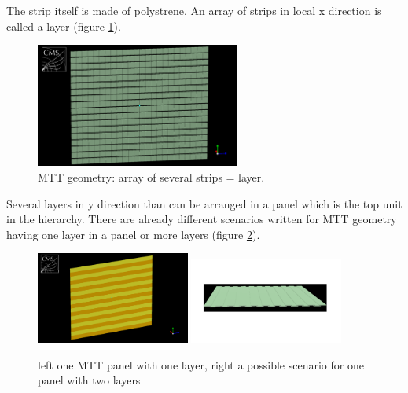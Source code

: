 			The strip itself is made of polystrene.
			An array of strips in local x direction is called a layer (figure \ref{fig:layer}).
			\begin{figure}[htbp]
				\centering
				\includegraphics[width=0.6\textwidth]{Figures/erdogan/layer.png}
				\caption{MTT geometry: array of several strips = layer.}
				\label{fig:layer}
			\end{figure}
			Several layers in y direction than can be arranged in a panel which is the top unit in the hierarchy.
			There are already different scenarios written for MTT geometry having one layer in a panel or more layers (figure \ref{fig:panel}).
			\begin{figure}[htbp]
				\centering
				\includegraphics[width=0.45\textwidth]{Figures/erdogan/panel1.png}
				\includegraphics[width=0.45\textwidth]{Figures/erdogan/panel2.png}
				\caption{left one MTT panel with one layer, right a possible scenario for one panel with two layers}
				\label{fig:panel}
			\end{figure}
